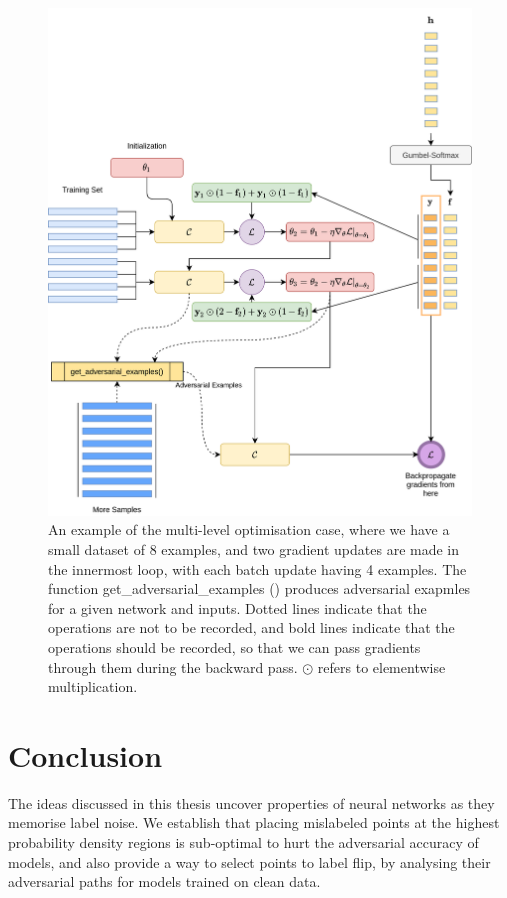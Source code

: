 \documentclass[12pt, oneside]{book}
\begin{document}
\begin{figure}
    \centering
    \includegraphics[scale=0.17]{biplot.png}
    \caption{An example of the multi-level optimisation case, where we have a
    small dataset of 8 examples, and two gradient updates are made in the
    innermost loop, with each batch update having 4 examples. The function
    get\_adversarial\_examples () produces adversarial exapmles for a given
    network and inputs. Dotted lines indicate that the operations are not to be
    recorded, and bold lines indicate that the operations should be recorded, so
    that we can pass gradients through them during the backward pass. $\odot$
    refers to elementwise multiplication.}
    \label{fig:bilevel-opt}
\end{figure}

\chapter{Conclusion}
The ideas discussed in this thesis uncover properties of neural networks as they
memorise label noise. We establish that placing mislabeled points at the highest
probability density regions is sub-optimal to hurt the adversarial accuracy of
models, and also provide a way to select points to label flip, by analysing
their adversarial paths for models trained on clean data.
\end{document}
